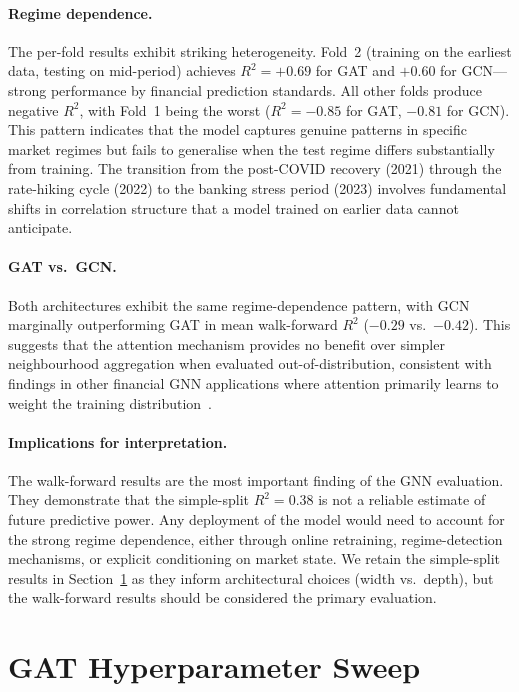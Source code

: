 \paragraph{Regime dependence.}
The per-fold results exhibit striking heterogeneity. Fold~2 (training on the earliest data, testing on mid-period) achieves $R^2 = +0.69$ for GAT and $+0.60$ for GCN---strong performance by financial prediction standards. All other folds produce negative $R^2$, with Fold~1 being the worst ($R^2 = -0.85$ for GAT, $-0.81$ for GCN). This pattern indicates that the model captures genuine patterns in specific market regimes but fails to generalise when the test regime differs substantially from training. The transition from the post-COVID recovery (2021) through the rate-hiking cycle (2022) to the banking stress period (2023) involves fundamental shifts in correlation structure that a model trained on earlier data cannot anticipate.

\paragraph{GAT vs.\ GCN.}
Both architectures exhibit the same regime-dependence pattern, with GCN marginally outperforming GAT in mean walk-forward $R^2$ ($-0.29$ vs.\ $-0.42$). This suggests that the attention mechanism provides no benefit over simpler neighbourhood aggregation when evaluated out-of-distribution, consistent with findings in other financial GNN applications where attention primarily learns to weight the training distribution~\cite{wu2020comprehensive}.

\paragraph{Implications for interpretation.}
The walk-forward results are the most important finding of the GNN evaluation. They demonstrate that the simple-split $R^2 = 0.38$ is not a reliable estimate of future predictive power. Any deployment of the model would need to account for the strong regime dependence, either through online retraining, regime-detection mechanisms, or explicit conditioning on market state. We retain the simple-split results in Section~\ref{sec:gat-sweep} as they inform architectural choices (width vs.\ depth), but the walk-forward results should be considered the primary evaluation.


\section{GAT Hyperparameter Sweep}
\label{sec:gat-sweep}

